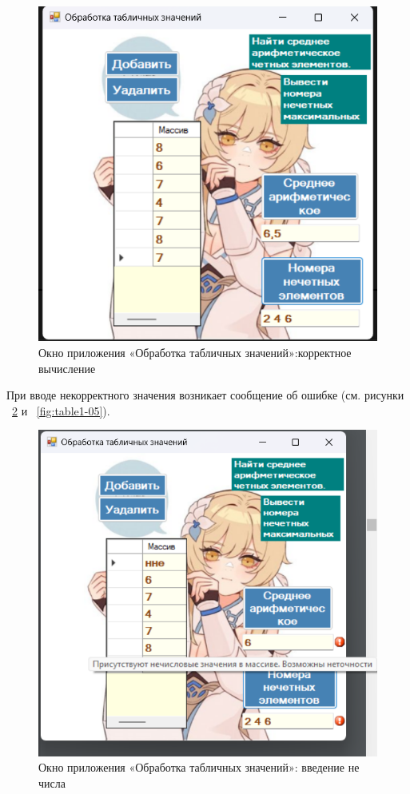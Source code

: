\documentclass[bachelor, och, pract, times]{SCWorks}
\begin{document}
\begin{figure}[H]
    \centering
    \includegraphics[scale=0.7]{Скрины/Снимок экрана 2025-01-04 235948.png}
    \caption{Окно приложения «Обработка табличных значений»:корректное вычисление}\label{fig:table1-03}
\end{figure}

При вводе некорректного значения возникает сообщение об ошибке (см.
рисунки ~\ref{fig:table1-04} и ~\ref{fig:table1-05}).

\begin{figure}[H]
    \centering
    \includegraphics[scale=0.7]{Скрины/Снимок экрана 2025-01-05 000158.png}
    \caption{Окно приложения «Обработка табличных значений»: введение не числа}\label{fig:table1-04}
\end{figure}
\end{document}
